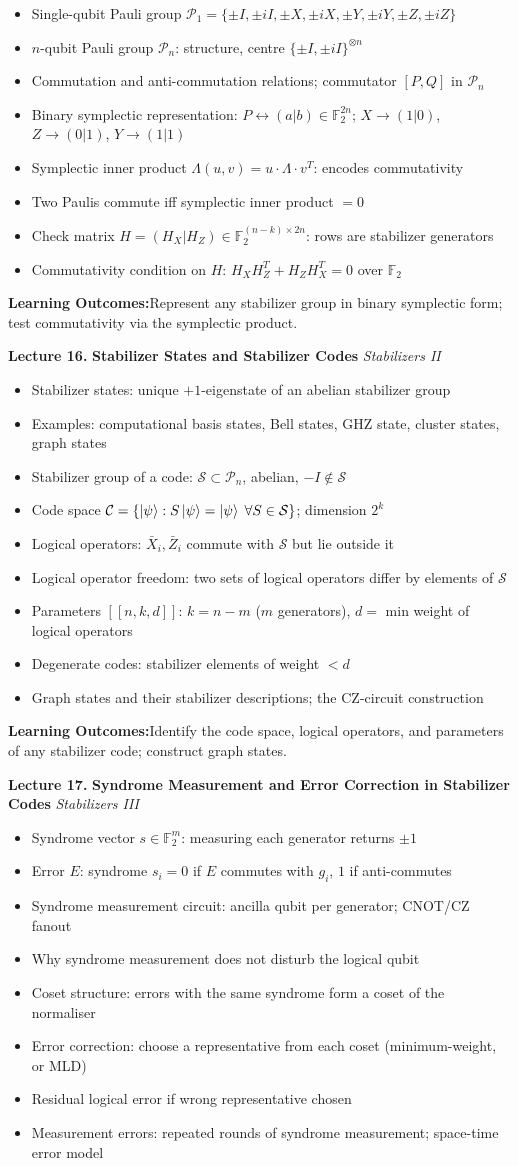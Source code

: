\documentclass[12pt,oneside]{article}
\newcommand{\lecturetitle}[3]{%
  \vspace{10pt}
  \begin{tcolorbox}[
    enhanced,breakable,
    colback=highlight,colframe=accent,
    arc=2pt,left=10pt,right=8pt,top=7pt,bottom=7pt,boxrule=0.7pt
  ]
    \textbf{\color{accent}Lecture #1.\enspace}%
    {\color{primary}\bfseries #2}%
    \hfill{\small\color{warmgold}\textit{#3}}
  \end{tcolorbox}
  \vspace{-2pt}
}
\newcommand{\topics}[1]{%
  \begin{itemize}[leftmargin=1.5em,itemsep=1.5pt,topsep=3pt,parsep=0pt]
    #1
  \end{itemize}\vspace{2pt}
}
\newcommand{\T}[1]{\item #1}
\newcommand{\keybox}[1]{%
  \begin{tcolorbox}[
    enhanced,colback=lightgray,colframe=rulegray,
    arc=2pt,left=8pt,right=8pt,top=5pt,bottom=5pt,boxrule=0.4pt,
    fontupper=\small
  ]
    \textbf{\color{primary}Learning Outcomes:\enspace}#1
  \end{tcolorbox}\vspace{4pt}
}
\begin{document}
\topics{
  \T{Single-qubit Pauli group $\mathcal{P}_1 = \{\pm I, \pm iI, \pm X, \pm iX, \pm Y, \pm iY, \pm Z, \pm iZ\}$}
  \T{$n$-qubit Pauli group $\mathcal{P}_n$: structure, centre $\{\pm I, \pm iI\}^{\otimes n}$}
  \T{Commutation and anti-commutation relations; commutator $[P,Q]$ in $\mathcal{P}_n$}
  \T{Binary symplectic representation: $P \leftrightarrow (a|b)\in\mathbb{F}_2^{2n}$; $X\to(1|0)$, $Z\to(0|1)$, $Y\to(1|1)$}
  \T{Symplectic inner product $\Lambda(u,v) = u\cdot \Lambda \cdot v^T$: encodes commutativity}
  \T{Two Paulis commute iff symplectic inner product $=0$}
  \T{Check matrix $H=(H_X|H_Z)\in\mathbb{F}_2^{(n-k)\times 2n}$: rows are stabilizer generators}
  \T{Commutativity condition on $H$: $H_X H_Z^T + H_Z H_X^T = 0$ over $\mathbb{F}_2$}
}

\keybox{Represent any stabilizer group in binary symplectic form; test commutativity via the symplectic product.}

\lecturetitle{16}{Stabilizer States and Stabilizer Codes}{Stabilizers II}

\topics{
  \T{Stabilizer states: unique $+1$-eigenstate of an abelian stabilizer group}
  \T{Examples: computational basis states, Bell states, GHZ state, cluster states, graph states}
  \T{Stabilizer group of a code: $\mathcal{S}\subset\mathcal{P}_n$, abelian, $-I\notin\mathcal{S}$}
  \T{Code space $\mathcal{C} = \{\ket{\psi}: S\ket{\psi}=\ket{\psi}\;\forall S\in\mathcal{S}\}$; dimension $2^k$}
  \T{Logical operators: $\bar{X}_i, \bar{Z}_i$ commute with $\mathcal{S}$ but lie outside it}
  \T{Logical operator freedom: two sets of logical operators differ by elements of $\mathcal{S}$}
  \T{Parameters $[[n,k,d]]$: $k=n-m$ ($m$ generators), $d=$ min weight of logical operators}
  \T{Degenerate codes: stabilizer elements of weight $<d$}
  \T{Graph states and their stabilizer descriptions; the CZ-circuit construction}
}

\keybox{Identify the code space, logical operators, and parameters of any stabilizer code; construct graph states.}

\lecturetitle{17}{Syndrome Measurement and Error Correction in Stabilizer Codes}{Stabilizers III}

\topics{
  \T{Syndrome vector $s\in\mathbb{F}_2^m$: measuring each generator returns $\pm 1$}
  \T{Error $E$: syndrome $s_i = 0$ if $E$ commutes with $g_i$, $1$ if anti-commutes}
  \T{Syndrome measurement circuit: ancilla qubit per generator; CNOT/CZ fanout}
  \T{Why syndrome measurement does not disturb the logical qubit}
  \T{Coset structure: errors with the same syndrome form a coset of the normaliser}
  \T{Error correction: choose a representative from each coset (minimum-weight, or MLD)}
  \T{Residual logical error if wrong representative chosen}
  \T{Measurement errors: repeated rounds of syndrome measurement; space-time error model}
}
\end{document}
